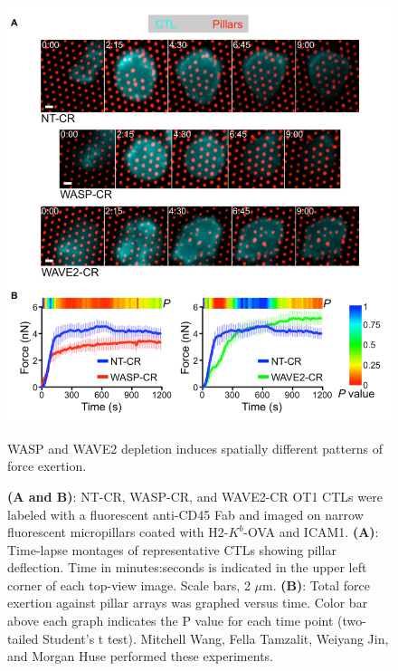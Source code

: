 \begin{figure}[htbp]
	\centering
	\includegraphics[width=\textwidth]{../figures/chapter2/fig6pillars.png}
	\caption{WASP and WAVE2 depletion induces spatially different patterns of force exertion.}
	\caption*{\textbf{(A and B)}: NT-CR, WASP-CR, and WAVE2-CR OT1 CTLs were labeled with a fluorescent anti-CD45 Fab and imaged on narrow fluorescent micropillars coated with H2-$K^{b}$-OVA and ICAM1. \textbf{(A)}: Time-lapse montages of representative CTLs showing pillar deflection. Time in minutes:seconds is indicated in the upper left corner of each top-view image. Scale bars, 2 $\mu$m. \textbf{(B)}: Total force exertion against pillar arrays was graphed versus time. Color bar above each graph indicates the P value for each time point (two-tailed Student’s t test). Mitchell Wang, Fella Tamzalit, Weiyang Jin, and Morgan Huse performed these experiments.}
	\label{fig:fig6pillars}
\end{figure}

